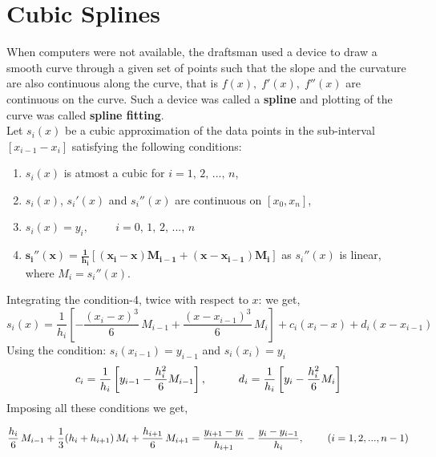 \documentclass[aima203_lecturenotes_ku.tex]{subfiles}
\begin{document}
\section{Cubic Splines}
When computers were not available, the draftsman used a device to draw a smooth curve through a given set of points such that the slope and the curvature are also continuous along the curve, that is $f(x), \; f'(x), \; f''(x)$ are continuous on the curve. Such a device was called a \textbf{spline} and plotting of the curve was called \textbf{spline fitting}. \\[1mm]
Let $s_i(x)$ be a cubic approximation of the data points in the sub-interval $[x_{i-1} -x_i]$ satisfying the following conditions:
\begin{enumerate}
\item $s_i(x)$ is atmost a cubic for $i = 1, \, 2, \, ..., \, n$,
\item $s_i(x)$, $s_i'(x)$ and $s_i''(x)$ are continuous on $[x_0,x_n]$,
\item $s_i(x)=y_i, \hspace{1cm} i=0,\, 1,\, 2, \, ..., \, n$
\item $\mathbf{s_i''(x) = \frac{1}{h_i} [ (x_i -x)M_{i-1} + (x-x_{i-1})M_i]}$ as $s_i''(x)$ is linear, where $M_i = s_i''(x)$.
\end{enumerate}
Integrating the condition-4, twice with respect to $x$: we get,
\begin{equation}
  \label{cubic_equation}
  s_i(x) = \frac{1}{h_i} \left [ -\frac{(x_i -x)^3}{6}\, M_{i-1} + \frac{(x-x_{i-1})^3}{6} \, M_i \right ] + c_i(x_i-x)+d_i(x-x_{i-1})
\end{equation}
Using the condition: $s_i(x_{i-1})=y_{i-1}$ and $s_i(x_i)=y_i$
\begin{equation}
    c_i = \frac{1}{h_i}\left [ y_{i-1} -  \frac{h_i^2}{6}M_{i-1} \right ], \hspace{10mm} d_i = \frac{1}{h_i}\left [ y_i -  \frac{h_i^2}{6}M_i \right ]
\end{equation}
Imposing all these conditions we get,
\begin{mdframed}
\begin{equation}
  \label{cubic}
  \frac{h_i}{6}\, M_{i-1} + \frac{1}{3}(h_i + h_{i+1})\, M_{i} + \frac{h_{i+1}}{6}\, M_{i+1} = \frac{y_{i+1} - y_i}{h_{i+1}} - \frac{y_i - y_{i-1}}{h_i}, \hspace{8mm} (i=1,2,...,n-1)
\end{equation}
\end{mdframed}
\end{document}
